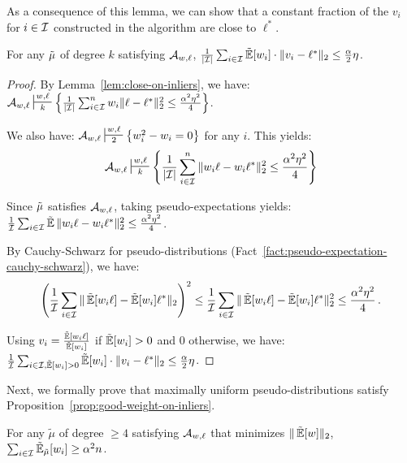 As a consequence of this lemma, we can show that a constant fraction of the $v_i$ for $i \in \mathcal I$ constructed in the algorithm are close to $\ell^*$. 

\begin{lemma}
For any $\tilde{\mu}$ of degree $k$ satisfying $\mathcal A_{w,\ell}$, 
$\frac{1}{|\mathcal I|} \sum_{i \in \mathcal I} \operatorname{\tilde{\mathbb{E}}}[w_i] \cdot \|v_i -\ell^*\|_2 \leq \frac{\alpha}{2}\eta$.
\label{lem:votes-are-close}
\end{lemma}
\begin{proof}
By Lemma~\ref{lem:close-on-inliers}, we have:
$
\cA_{w,\ell} \sststile{k}{w,\ell} \Set{\frac{1}{|\cI|}\sum_{i \in \cI}^n w_i \|\ell - \ell^*\|^2_2\leq \frac{\alpha^2 \eta^2}{4} }
$.


We also have: $\cA_{w,\ell} \sststile{2}{w,\ell} \Set{w_i^2 - w_i =0}$ for any $i$. This yields:
\[
\cA_{w,\ell} \sststile{k}{w,\ell} \Set{\frac{1}{|\cI|}\sum_{i \in \cI}^n \|w_i\ell - w_i\ell^*\|^2_2\leq\frac{\alpha^2 \eta^2}{4} }
\]



Since $\tilde{\mu}$ satisfies $\mathcal A_{w,\ell}$, taking pseudo-expectations yields:$
 \frac{1}{\mathcal I} \sum_{i \in \mathcal I}\operatorname{\tilde{\mathbb{E}}} \| w_i\ell  - w_i \ell^*\|_2^2 \leq \frac{\alpha^2 \eta^2}{4}$.

By Cauchy-Schwarz for pseudo-distributions (Fact~\ref{fact:pseudo-expectation-cauchy-schwarz}), we have:
\[
 \left(\frac{1}{\mathcal I} \sum_{i \in \mathcal I} \| \operatorname{\tilde{\mathbb{E}}}[w_i\ell]  - \operatorname{\tilde{\mathbb{E}}}[w_i] \ell^*\|_2\right)^2 \leq \frac{1}{\mathcal I} \sum_{i \in \mathcal I} \| \operatorname{\tilde{\mathbb{E}}}[w_i\ell]  - \operatorname{\tilde{\mathbb{E}}}[w_i] \ell^*\|_2^2 \leq \frac{\alpha^2 \eta^2}{4} \,.
\]



Using $v_i = \frac{\operatorname{\tilde{\mathbb{E}}}[w_i \ell]}{\operatorname{\tilde{\mathbb{E}}}[w_i]}$ if $\operatorname{\tilde{\mathbb{E}}}[w_i] >0$ and $0$ otherwise, we have:
$ \frac{1}{\mathcal I} \sum_{i \in \mathcal I, \operatorname{\tilde{\mathbb{E}}}[w_i] > 0} \operatorname{\tilde{\mathbb{E}}}[w_i]\cdot \|v_i -  \ell^*\|_2 \leq \frac{\alpha}{2}\eta $.



\end{proof}







Next, we formally prove that maximally uniform pseudo-distributions satisfy Proposition~\ref{prop:good-weight-on-inliers}.
\begin{lemma}
For any $\tilde{\mu}$ of degree $\geq 4$ satisfying $\mathcal A_{w,\ell}$ that minimizes $\|\operatorname{\tilde{\mathbb{E}}}[w]\|_2$, $\sum_{i \in \mathcal I} \operatorname{\tilde{\mathbb{E}}}_{\tilde{\mu}}[w_i] \geq \alpha^2 n$.
 \label{lem:large-weight-on-inliers}
\end{lemma}

